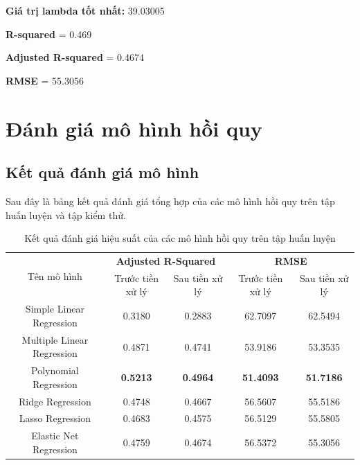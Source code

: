 \documentclass[runningheads]{llncs}
\begin{document}
\textbf{Giá trị lambda tốt nhất:} 39.03005

\textbf{R-squared} = 0.469

\textbf{Adjusted R-squared} = 0.4674 

\textbf{RMSE} = 55.3056

\section{Đánh giá mô hình hồi quy}

\subsection{Kết quả đánh giá mô hình}

Sau đây là bảng kết quả đánh giá tổng hợp của các mô hình hồi quy trên tập huấn luyện và tập kiểm thử.

\begin{table}[H]
	\scriptsize
	\setlength{\tabcolsep}{0.5em}
	\renewcommand{\arraystretch}{1.5}
	\begin{center}
		\caption{Kết quả đánh giá hiệu suất của các mô hình hồi quy trên tập huấn luyện}\label{tab3}
		\begin{tabular}{|c|c|c|c|c|}
			\hline
			\multirow{2}{*}{Tên mô hình} & \multicolumn{2}{c|}{\textbf{Adjusted R-Squared}} & \multicolumn{2}{c|}{\textbf{RMSE}}\\ \cline{2-5}
										 & \multicolumn{1}{c|}{Trước tiền xử lý} & \multicolumn{1}{c|}{Sau tiền xử lý}
										 & \multicolumn{1}{c|}{Trước tiền xử lý} & \multicolumn{1}{c|}{Sau tiền xử lý}\\
			\hline
			Simple Linear Regression&0.3180&0.2883&62.7097&62.5494\\
			\hline
			Multiple Linear Regression&0.4871&0.4741&53.9186&53.3535\\
			\hline
			Polynomial Regression&\textbf{0.5213}&\textbf{0.4964}&\textbf{51.4093}&\textbf{51.7186}\\
			\hline
			Ridge Regression&0.4748&0.4667&56.5607&55.5186\\
			\hline
			Lasso Regression&0.4683&0.4575&56.5129&55.5805\\
			\hline
			Elastic Net Regression&0.4759&0.4674&56.5372&55.3056\\
			\hline
		\end{tabular}			
	\end{center}
\end{table}
\end{document}
